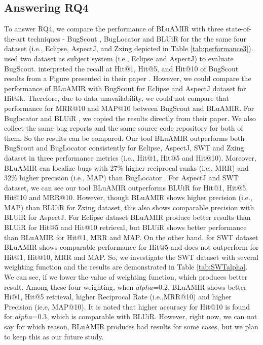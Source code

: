 \documentclass[conference]{IEEEtran}
\begin{document}
\subsection{Answering RQ4}\label{RQ4answer}
To answer RQ4, we compare the performance of BLuAMIR with three state-of-the-art techniques - BugScout \cite{Nguyen}, BugLocator \cite{Jian} and BLUiR \cite{Saha} for the the same four dataset (i.e., Eclipse, AspectJ, and Zxing depicted in Table \ref{tab:performance3}). 
\citet{Nguyen} used two dataset as subject system (i.e., Eclipse and AspectJ) to evaluate BugScout. 
\citet{Saha} interpreted the recall at Hit@1, Hit@5, and Hit@10 of BugScout \cite{Nguyen} results from a Figure presented in their paper \cite{Nguyen}. However, we could compare the performance of BLuAMIR with BugScout for Eclipse and AspectJ dataset for Hit@k. Therefore, due to data unavailability, we could not compare that performance for MRR@10 and MAP@10 between BugScout and BLuAMIR.
For Buglocator \cite{Jian} and BLUiR \cite{Saha}, we copied the results directly from their paper. We also collect the same bug reports and the same source code repository for both of them. So the results can be compared. 
Our tool BLuAMIR outperforms both BugScout \cite{Nguyen} and BugLocator \cite{Jian} consistently for Eclipse, AspectJ, SWT and Zxing dataset in three performance metrics (i.e., Hit@1, Hit@5 and Hit@10). 
Moreover, BLuAMIR can localize bugs with 27\% higher reciprocal ranks (i.e., MRR) and 32\% higher precision (i.e., MAP) than BugLocator \cite{Jian}.  
For AspectJ and SWT dataset, we can see our tool BLuAMIR outperforms BLUiR \cite{Saha} for Hit@1, Hit@5, Hit@10 and MRR@10. However, though BLuAMIR shows higher precision (i.e., MAP) than BLUiR \cite{Saha} for Zxing dataset, this also shows comparable precision with BLUiR \cite{Saha} for AspectJ.
For Eclipse dataset BLuAMIR produce better results than BLUiR \cite{Saha} for Hit@5 and Hit@10 retrieval, but BLUiR \cite{Saha} shows better performance than BLuAMIR for Hit@1, MRR and MAP. On the other hand, for SWT dataset BLuAMIR shows comparable performance for Hit@5 and does not outperform for Hit@1, Hit@10, MRR and MAP. 
So, we investigate the SWT dataset with several weighting function and the results are demonstrated in Table \ref{tab:SWTalpha}. We can see, if we lower the value of weighting function, which produces better result. Among these four weighting, when $alpha$=$0.2$, BLuAMIR shows better Hi@1, Hit@5 retrieval, higher Reciprocal Rate (i.e.,MRR@10) and higher Precision (ie.e, MAP@10). It is noted that higher accuracy for Hit@10 is found for $alpha$=$0.3$, which is comparable with BLUiR\cite{Saha}. However, right now, we can not say for which reason, BLuAMIR produces bad results for some cases, but we plan to keep this as our future study.    
\end{document}
